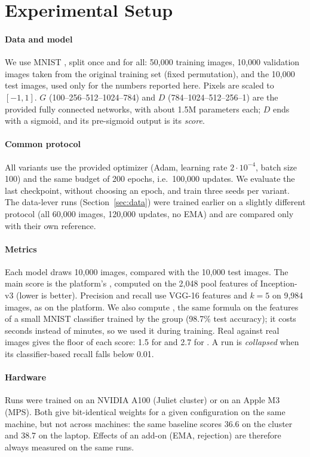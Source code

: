 \section{Experimental Setup}
\label{sec:setup}
\paragraph{Data and model}
We use MNIST \cite{lecun1998}, split once and for all: 50,000 training images, 10,000 validation images taken from the original training set (fixed permutation), and the 10,000 test images, used only for the numbers reported here. Pixels are scaled to $[-1,1]$. $G$ (100--256--512--1024--784) and $D$ (784--1024--512--256--1) are the provided fully connected networks, with about 1.5M parameters each; $D$ ends with a sigmoid, and its pre-sigmoid output is its \emph{score}.

\paragraph{Common protocol}
All variants use the provided optimizer (Adam, learning rate $2\cdot10^{-4}$, batch size 100) and the same budget of 200 epochs, i.e.\ 100,000 updates. We evaluate the last checkpoint, without choosing an epoch, and train three seeds per variant. The data-lever runs (Section~\ref{sec:data}) were trained earlier on a slightly different protocol (all 60,000 images, 120,000 updates, no EMA) and are compared only with their own reference.

\paragraph{Metrics}
Each model draws 10,000 images, compared with the 10,000 test images. The main score is the platform's \finc{}, computed on the 2,048 pool features of Inception-v3 \cite{szegedy2016} (lower is better). Precision and recall use VGG-16 features \cite{simonyan2015} and $k=5$ on 9,984 images, as on the platform. We also compute \fcnn{}, the same formula on the features of a small MNIST classifier trained by the group (98.7\% test accuracy); it costs seconds instead of minutes, so we used it during training. Real against real images gives the floor of each score: 1.5 for \finc{} and 2.7 for \fcnn{}. A run is \emph{collapsed} when its classifier-based recall falls below 0.01.

\paragraph{Hardware}
Runs were trained on an NVIDIA A100 (Juliet cluster) or on an Apple M3 (MPS). Both give bit-identical weights for a given configuration on the same machine, but not across machines: the same baseline scores 36.6 on the cluster and 38.7 on the laptop. Effects of an add-on (EMA, rejection) are therefore always measured on the same runs.

